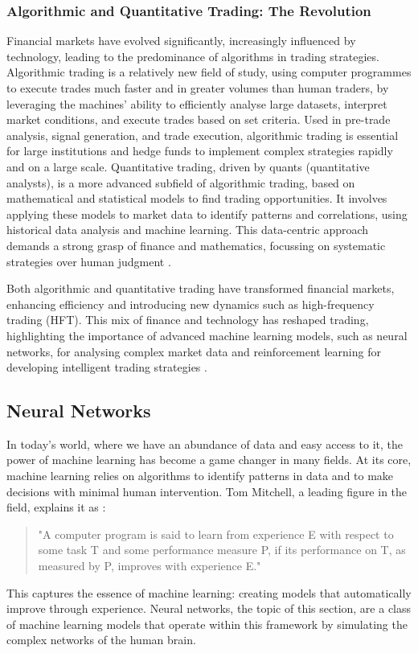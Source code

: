 \subsubsection{Algorithmic and Quantitative Trading: The Revolution}

Financial markets have evolved significantly, increasingly influenced by technology, leading to the predominance of algorithms in trading strategies. Algorithmic trading is a relatively new field of study, using computer programmes to execute trades much faster and in greater volumes than human traders, by leveraging the machines' ability to efficiently analyse large datasets, interpret market conditions, and execute trades based on set criteria. Used in pre-trade analysis, signal generation, and trade execution, algorithmic trading is essential for large institutions and hedge funds to implement complex strategies rapidly and on a large scale. Quantitative trading, driven by quants (quantitative analysts), is a more advanced subfield of algorithmic trading, based on mathematical and statistical models to find trading opportunities. It involves applying these models to market data to identify patterns and correlations, using historical data analysis and machine learning. This data-centric approach demands a strong grasp of finance and mathematics, focussing on systematic strategies over human judgment \cite{chan_quantitative_2021}.

Both algorithmic and quantitative trading have transformed financial markets, enhancing efficiency and introducing new dynamics such as high-frequency trading (HFT). This mix of finance and technology has reshaped trading, highlighting the importance of advanced machine learning models, such as neural networks, for analysing complex market data and reinforcement learning for developing intelligent trading strategies \cite{jansen_machine_2020}.

\subsection{Neural Networks}

In today's world, where we have an abundance of data and easy access to it, the power of machine learning has become a game changer in many fields. At its core, machine learning relies on algorithms to identify patterns in data and to make decisions with minimal human intervention. Tom Mitchell, a leading figure in the field, explains it as \cite{mitchell_machine_1997}:
\begin{quote}
"A computer program is said to learn from experience E with respect to some task T and some performance measure P, if its performance on T, as measured by P, improves with experience E."
\end{quote}
This captures the essence of machine learning: creating models that automatically improve through experience. Neural networks, the topic of this section, are a class of machine learning models that operate within this framework by simulating the complex networks of the human brain.

